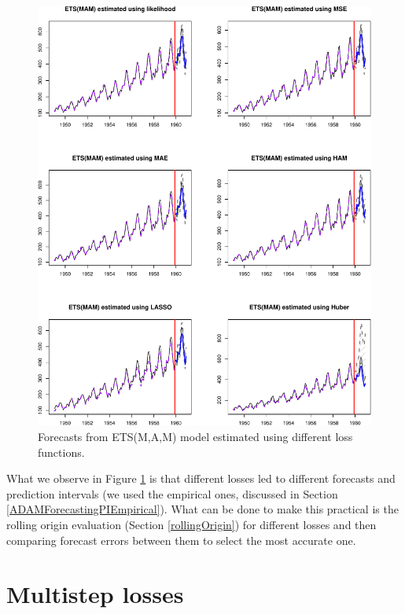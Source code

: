 \documentclass[
]{book}
\theoremstyle{definition}
\theoremstyle{definition}
\theoremstyle{definition}
\theoremstyle{definition}
\theoremstyle{remark}
\begin{document}
\begin{figure}
\centering
\includegraphics{Svetunkov--2022----ADAM_files/figure-latex/adamModelsForecasts-1.pdf}
\caption{\label{fig:adamModelsForecasts}Forecasts from ETS(M,A,M) model estimated using different loss functions.}
\end{figure}

What we observe in Figure \ref{fig:adamModelsForecasts} is that different losses led to different forecasts and prediction intervals (we used the empirical ones, discussed in Section \ref{ADAMForecastingPIEmpirical}). What can be done to make this practical is the rolling origin evaluation (Section \ref{rollingOrigin}) for different losses and then comparing forecast errors between them to select the most accurate one.

\hypertarget{multistepLosses}{%
\section{Multistep losses}\label{multistepLosses}}
\end{document}

